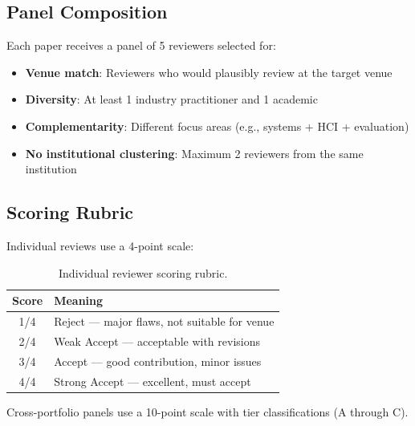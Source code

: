 \subsection{Panel Composition}

Each paper receives a panel of 5 reviewers selected for:
\begin{itemize}
    \item \textbf{Venue match}: Reviewers who would plausibly review at the target venue
    \item \textbf{Diversity}: At least 1 industry practitioner and 1 academic
    \item \textbf{Complementarity}: Different focus areas (e.g., systems + HCI + evaluation)
    \item \textbf{No institutional clustering}: Maximum 2 reviewers from the same institution
\end{itemize}

\subsection{Scoring Rubric}

Individual reviews use a 4-point scale:

\begin{table}[h]
\centering
\begin{tabular}{cl}
\toprule
Score & Meaning \\
\midrule
1/4 & Reject --- major flaws, not suitable for venue \\
2/4 & Weak Accept --- acceptable with revisions \\
3/4 & Accept --- good contribution, minor issues \\
4/4 & Strong Accept --- excellent, must accept \\
\bottomrule
\end{tabular}
\caption{Individual reviewer scoring rubric.}
\end{table}

Cross-portfolio panels use a 10-point scale with tier classifications (A through C).
